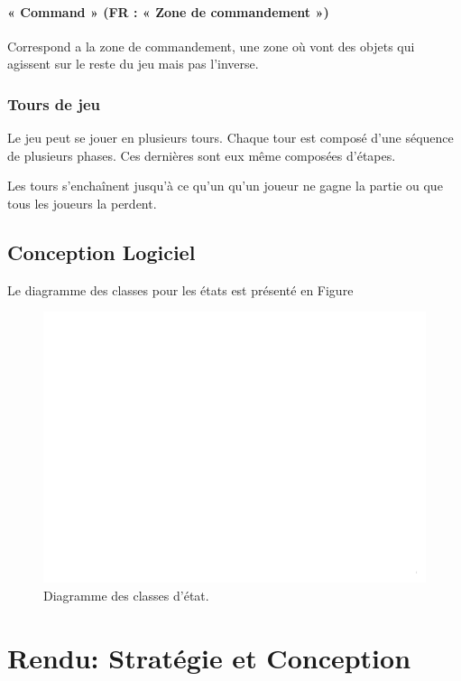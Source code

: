 \documentclass[a4paper,12pt]{article}
\begin{document}
\paragraph{« Command » (FR : « Zone de commandement »)}
Correspond a la zone de commandement, une zone où vont des objets qui agissent sur le reste du jeu mais pas l'inverse.

\subsubsection{Tours de jeu}
Le jeu peut se jouer en plusieurs tours. Chaque tour est composé d’une séquence de plusieurs phases. Ces dernières sont eux même composées d’étapes.

Les tours s’enchaînent jusqu’à ce qu'un qu'un joueur ne gagne la partie ou que tous les joueurs la perdent.

\subsection{Conception Logiciel}
Le diagramme des classes pour les états est présenté en Figure

\begin{landscape}
\begin{figure}[p]
\includegraphics[width=0.95\paperheight, page=4, trim=0 600 0 0, clip]{state.pdf}
\caption{\label{uml:state}Diagramme des classes d'état.} 
\end{figure}
\end{landscape}

\clearpage
\section{Rendu: Stratégie et Conception}
\end{document}
